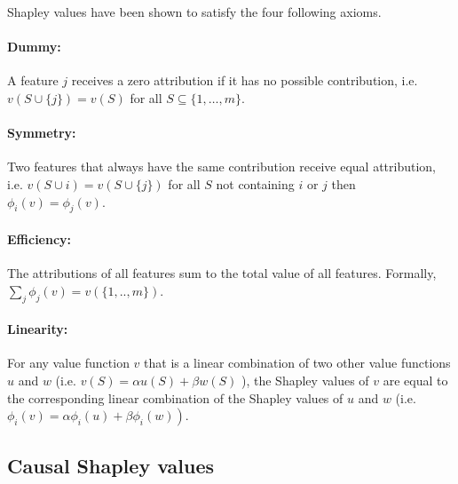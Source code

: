 Shapley values have been shown to satisfy the four following axioms.
\paragraph{Dummy:}{A feature $j$ receives a zero attribution if it has no possible contribution, i.e. $v(S \cup \{j\})=v(S)$ for all $S \subseteq\{1, \ldots, m\}$.}
\paragraph{Symmetry:}{Two features that always have the same contribution receive equal attribution, i.e. $v(S \cup i)=v(S \cup \{j\})$ for all $S$ not containing $i$ or $j$ then $\phi_{i}(v)=\phi_{j}(v)$.}
\paragraph{Efficiency:} {The attributions of all features sum to the total value of all features. Formally, $\sum_{j} \phi_{j}(v)=v(\{1, . ., m\})$.}
\paragraph{Linearity:} {For any value function $v$ that is a linear combination of two other value functions $u$ and $w$ (i.e. $v(S)=\alpha u(S)+\beta w(S)$ ), the Shapley values of $v$ are equal to the corresponding linear combination of the Shapley values of $u$ and $w$ (i.e. $\left.\phi_{i}(v)=\alpha \phi_{i}(u)+\beta \phi_{i}(w)\right)$.}


\subsection{Causal Shapley values} \label{subsec:causal_shap}


